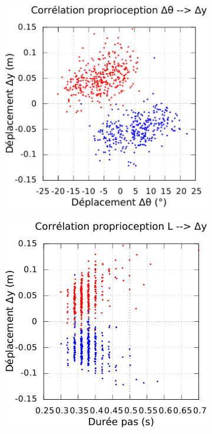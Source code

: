 \begin{figure}[htbp]
\begin{subfigure}{0.22\paperwidth}
    \end{subfigure}
    \begin{subfigure}{0.22\paperwidth}
        \centering
        \includegraphics[type=pdf,ext=.pdf,read=.pdf,width=1.0\linewidth]{../plot/OdometryLWPR/grass_close_function_read_yaw_y}
    \end{subfigure}
    \begin{subfigure}{0.22\paperwidth}
        \centering
        \includegraphics[type=pdf,ext=.pdf,read=.pdf,width=1.0\linewidth]{../plot/OdometryLWPR/grass_close_function_read_len_y}

\end{subfigure}
\end{figure}
